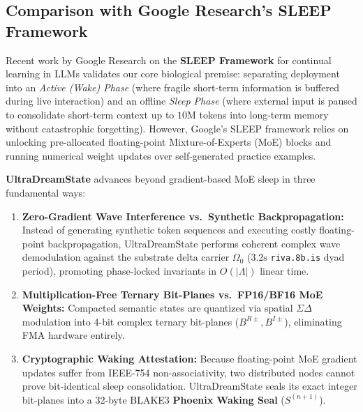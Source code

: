 \documentclass[10pt, twocolumn, a4paper]{article}
\begin{document}
\subsection{Comparison with Google Research's SLEEP Framework}
Recent work by Google Research on the \textbf{SLEEP Framework} for continual learning in LLMs \cite{googlesleep2026} validates our core biological premise: separating deployment into an \textit{Active (Wake) Phase} (where fragile short-term information is buffered during live interaction) and an offline \textit{Sleep Phase} (where external input is paused to consolidate short-term context up to $10\text{M}$ tokens into long-term memory without catastrophic forgetting). However, Google's SLEEP framework relies on unlocking pre-allocated floating-point Mixture-of-Experts (MoE) blocks and running numerical weight updates over self-generated practice examples.

\textbf{UltraDreamState} advances beyond gradient-based MoE sleep in three fundamental ways:
\begin{enumerate}
    \item \textbf{Zero-Gradient Wave Interference vs.\ Synthetic Backpropagation:} Instead of generating synthetic token sequences and executing costly floating-point backpropagation, UltraDreamState performs coherent complex wave demodulation against the substrate delta carrier $\Omega_0$ ($\text{3.2s}$ \texttt{riva.8b.is} dyad period), promoting phase-locked invariants in $O(|\Lambda|)$ linear time.
    \item \textbf{Multiplication-Free Ternary Bit-Planes vs.\ FP16/BF16 MoE Weights:} Compacted semantic states are quantized via spatial $\Sigma\Delta$ modulation into 4-bit complex ternary bit-planes ($B^{R\pm}, B^{I\pm}$), eliminating FMA hardware entirely.
    \item \textbf{Cryptographic Waking Attestation:} Because floating-point MoE gradient updates suffer from IEEE-754 non-associativity, two distributed nodes cannot prove bit-identical sleep consolidation. UltraDreamState seals its exact integer bit-planes into a 32-byte BLAKE3 \textbf{Phoenix Waking Seal} ($S^{(n+1)}$).
\end{enumerate}
\end{document}
